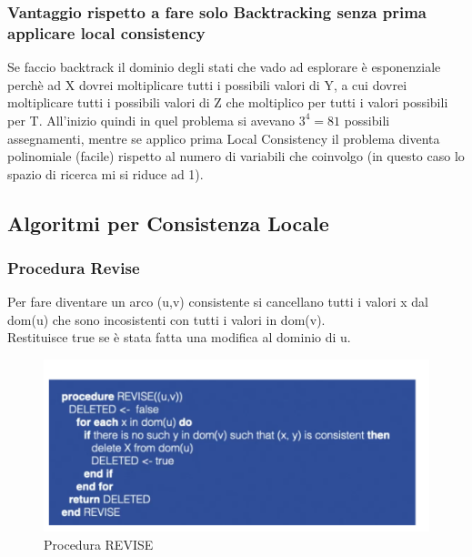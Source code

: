 \subsubsection{\textbf{Vantaggio rispetto a fare solo Backtracking senza prima applicare local consistency}}
Se faccio backtrack il dominio degli stati che vado ad esplorare è esponenziale perchè ad X dovrei moltiplicare tutti i possibili valori di Y, a cui dovrei moltiplicare tutti i possibili valori di Z che moltiplico per tutti i valori possibili per T. All’inizio quindi in quel problema si avevano $3^4 = 81$ possibili assegnamenti, mentre se applico prima Local Consistency il problema diventa polinomiale (facile) rispetto al numero di variabili che coinvolgo (in questo caso lo spazio di ricerca mi si riduce ad 1).

\subsection{Algoritmi per Consistenza Locale}
\subsubsection{Procedura Revise}
Per fare diventare un arco (u,v) consistente si cancellano tutti i valori x dal dom(u) che sono incosistenti con tutti i valori in dom(v).
\\Restituisce true se è stata fatta una modifica al dominio di u.
\begin{figure}[htp]
	\centering
    \includegraphics[width=13cm, keepaspectratio]{img/Cap3/revise.png}
    \caption{Procedura REVISE}
\end{figure}

